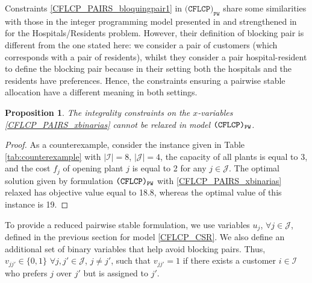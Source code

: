 \documentclass[preprint,11pt,authoryear]{elsarticle}
\def\J{\mathcal{J}}
\def\I{\mathcal{I}}
\newtheorem{prop}[theorem]{Proposition}
\begin{document}
Constraints \eqref{CFLCP_PAIRS_bloquingpair1} in $\texttt{(CFLCP)}_{\texttt{PW}}$ share some similarities with those in the integer programming model presented in \cite{kwanashie2014} and strengthened in \cite{delorme2019} for the Hospitals/Residents problem. However, their definition of blocking pair is different from the one stated here: we consider a pair of customers (which corresponds with a pair of residents), whilst they consider a pair hospital-resident to define the blocking pair because in their setting both the hospitals and the residents have preferences. Hence, the constraints ensuring a pairwise stable allocation have a different meaning in both settings.

\begin{prop}
    The integrality constraints on the $x$-variables \eqref{CFLCP_PAIRS_xbinarias} cannot be relaxed in model ${\normalfont \texttt{(CFLCP)}_{\texttt{PW}}}$.
\end{prop}
\begin{proof}
     As a counterexample, consider the instance given in Table \ref{tab:counterexample} with $|\I|=8$, $|\J|=4$, the capacity of all plants is equal to 3, and the cost $f_j$ of opening plant $j$ is equal to 2 for any $j\in \J$. The optimal solution given by formulation ${\rm \texttt{(CFLCP)}_{\texttt{PW}}}$ with \eqref{CFLCP_PAIRS_xbinarias} relaxed has objective value equal to 18.8, whereas the  optimal value of this instance is 19. 
\end{proof}
To provide a reduced pairwise stable formulation, we use variables $u_j$, $\forall j\in \J$, defined in the previous section for model \eqref{CFLCP_CSR}. We also define an additional set of binary variables that help avoid blocking pairs. Thus, $v_{jj'}\in\{0,1\}$ $\forall j,j'\in \J$, $j\neq j'$, such that $v_{jj'}=1$ if there exists a customer $i\in \I$ who prefers $j$ over $j'$ but is assigned to $j'$.
\end{document}
